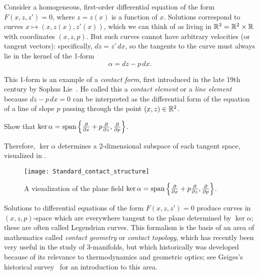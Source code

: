 \begin{example}\label{ex:standard contact structure}
	Consider a homogeneous, first-order differential equation of the form $F(x,z,z') = 0$, where $z=z(x)$ is a function of $x$. Solutions correspond to curves $x \mapsto (x,z(x),z'(x))$, which we can think of as living in $\mathbb{R}^3 = \mathbb{R}^2 \times \mathbb{R}$ with coordinates $(x,z,p)$. But such curves cannot have arbitrary velocities (or tangent vectors): specifically, $dz = z'\, dx$, so the tangents to the curve must always lie in the kernel of the 1-form
	\[
		\alpha = dz - p\, dx.
	\]
	
	This 1-form is an example of a \emph{contact form}, first introduced in the late 19th century by Sophus Lie~\cite{Lie1872}. He called this a \emph{contact element} or a \emph{line element} because $dz - p\, dx = 0$ can be interpreted as the differential form of the equation of a line of slope $p$ passing through the point $(x,z) \in \mathbb{R}^2$.
	
	\begin{exercise}
		Show that $\ker \alpha = \operatorname{span} \left\{ \frac{\partial}{\partial x} + p \frac{\partial}{\partial z}, \frac{\partial}{\partial p}\right\}$.
	\end{exercise}
	
	Therefore, $\ker \alpha$ determines a 2-dimensional subspace of each tangent space, visualized in .
	
	\begin{figure}[htbp]
		\centering
			\texttt{[image: Standard\_contact\_structure]}
		\caption{A visualization of the plane field $\ker \alpha = \operatorname{span} \left\{ \frac{\partial}{\partial x} + p \frac{\partial}{\partial z}, \frac{\partial}{\partial p}\right\}$.}
		\label{fig:contact structure}
	\end{figure}
	
	Solutions to differential equations of the form $F(x,z,z')=0$ produce curves in $(x,z,p)$-space which are everywhere tangent to the plane determined by $\ker \alpha$; these are often called Legendrian curves. This formalism is the basis of an area of mathematics called \emph{contact geometry} or \emph{contact topology}, which has recently been very useful in the study of 3-manifolds, but which historically was developed because of its relevance to thermodynamics and geometric optics; see Geiges's historical survey~\cite{geigesBriefHistoryContact2001} for an introduction to this area.
\end{example}

